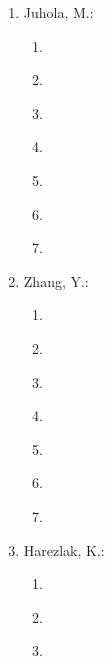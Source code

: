 \begin{enumerate}[label=\arabic*.,ref=\arabic*]
\begin{enumerate}[label*=\arabic*.,ref=\theenumi.\arabic*]
        \item \cite{komogortsev2015attack} 
        \item \cite{komogortsev2013liveness} 
        \item \cite{komogortsev2014template} 
        \item \cite{komogortsev2015biometrics} 
        \item \cite{komogortsev20132d} 
        \item \cite{komogortsev2012cue} 
        \item \cite{komogortsev2016oculomotor}			
    \end{enumerate}
    \item Juhola, M.:  
    \begin{enumerate}[label*=\arabic*.,ref=\theenumi.\arabic*]
        \item \cite{juhola2013biometric} 
        \item \cite{zhang2012biometric} 
        \item \cite{zhang2014biometricb} 
        \item \cite{zhang2015biometric} 
        \item \cite{zhang2017biometrics} 
        \item \cite{zhang2014biometric} 
        \item \cite{zhang2013applying}
    \end{enumerate}
    \item Zhang, Y.:  
    \begin{enumerate}[label*=\arabic*.,ref=\theenumi.\arabic*]
        \item \cite{juhola2013biometric} 
        \item \cite{zhang2012biometric} 
        \item \cite{zhang2014biometricb} 
        \item \cite{zhang2015biometric} 
        \item \cite{zhang2017biometrics} 
        \item \cite{zhang2014biometric} 
        \item \cite{zhang2013applying}			 
    \end{enumerate}
    \item Harezlak, K.:  
    \begin{enumerate}[label*=\arabic*.,ref=\theenumi.\arabic*]
        \item \cite{kasprowski2014second} 
        \item \cite{kasprowski2018fusion} 
        \item \cite{kasprowski2016using} 

\end{enumerate}
\end{enumerate}
